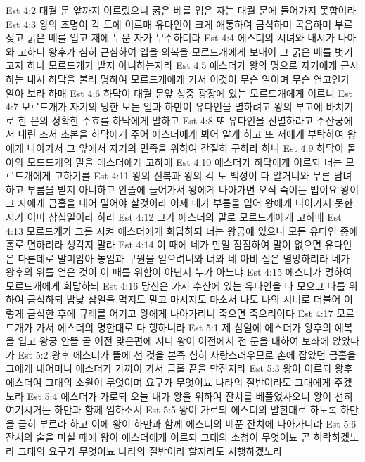 Est 4:2  대궐 문 앞까지 이르렀으니 굵은 베를 입은 자는 대궐 문에 들어가지 못함이라
Est 4:3  왕의 조명이 각 도에 이르매 유다인이 크게 애통하여 금식하며 곡읍하며 부르짖고 굵은 베를 입고 재에 누운 자가 무수하더라
Est 4:4  에스더의 시녀와 내시가 나아와 고하니 왕후가 심히 근심하여 입을 의복을 모르드개에게 보내어 그 굵은 베를 벗기고자 하나 모르드개가 받지 아니하는지라
Est 4:5  에스더가 왕의 명으로 자기에게 근시하는 내시 하닥을 불러 명하여 모르드개에게 가서 이것이 무슨 일이며 무슨 연고인가 알아 보라 하매
Est 4:6  하닥이 대궐 문앞 성중 광장에 있는 모르드개에게 이르니
Est 4:7  모르드개가 자기의 당한 모든 일과 하만이 유다인을 멸하려고 왕의 부고에 바치기로 한 은의 정확한 수효를 하닥에게 말하고
Est 4:8  또 유다인을 진멸하라고 수산궁에서 내린 조서 초본을 하닥에게 주어 에스더에게 뵈어 알게 하고 또 저에게 부탁하여 왕에게 나아가서 그 앞에서 자기의 민족을 위하여 간절히 구하라 하니
Est 4:9  하닥이 돌아와 모드드개의 말을 에스더에게 고하매
Est 4:10  에스더가 하닥에게 이르되 너는 모르드개에게 고하기를
Est 4:11  왕의 신복과 왕의 각 도 백성이 다 알거니와 무론 남녀하고 부름을 받지 아니하고 안뜰에 들어가서 왕에게 나아가면 오직 죽이는 법이요 왕이 그 자에게 금홀을 내어 밀어야 살것이라 이제 내가 부름을 입어 왕에게 나아가지 못한지가 이미 삼십일이라 하라
Est 4:12  그가 에스더의 말로 모르드개에게 고하매
Est 4:13  모르드개가 그를 시켜 에스더에게 회답하되 너는 왕궁에 있으니 모든 유다인 중에 홀로 면하리라 생각지 말라
Est 4:14  이 때에 네가 만일 잠잠하여 말이 없으면 유다인은 다른데로 말미암아 놓임과 구원을 얻으려니와 너와 네 아비 집은 멸망하리라 네가 왕후의 위를 얻은 것이 이 때를 위함이 아닌지 누가 아느냐
Est 4:15  에스더가 명하여 모르드개에게 회답하되
Est 4:16  당신은 가서 수산에 있는 유다인을 다 모으고 나를 위하여 금식하되 밤낮 삼일을 먹지도 말고 마시지도 마소서 나도 나의 시녀로 더불어 이렇게 금식한 후에 규례를 어기고 왕에게 나아가리니 죽으면 죽으리이다
Est 4:17  모르드개가 가서 에스더의 명한대로 다 행하니라
Est 5:1  제 삼일에 에스더가 왕후의 예복을 입고 왕궁 안뜰 곧 어전 맞은편에 서니 왕이 어전에서 전 문을 대하여 보좌에 앉았다가
Est 5:2  왕후 에스더가 뜰에 선 것을 본즉 심히 사랑스러우므로 손에 잡았던 금홀을 그에게 내어미니 에스더가 가까이 가서 금홀 끝을 만진지라
Est 5:3  왕이 이르되 왕후 에스더여 그대의 소원이 무엇이며 요구가 무엇이뇨 나라의 절반이라도 그대에게 주겠노라
Est 5:4  에스더가 가로되 오늘 내가 왕을 위하여 잔치를 베풀었사오니 왕이 선히 여기시거든 하만과 함께 임하소서
Est 5:5  왕이 가로되 에스더의 말한대로 하도록 하만을 급히 부르라 하고 이에 왕이 하만과 함께 에스더의 베푼 잔치에 나아가니라
Est 5:6  잔치의 술을 마실 때에 왕이 에스더에게 이르되 그대의 소청이 무엇이뇨 곧 허락하겠노라 그대의 요구가 무엇이뇨 나라의 절반이라 할지라도 시행하겠노라
